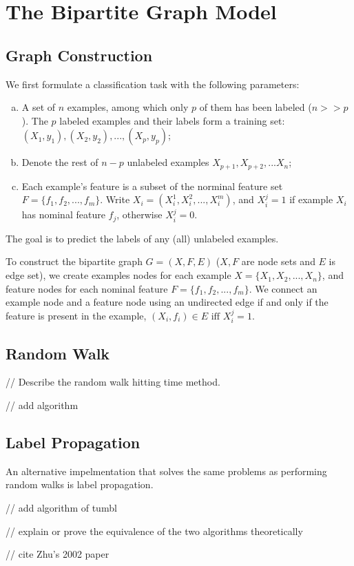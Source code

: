 \section{The Bipartite Graph Model}
\subsection{Graph Construction}

We first formulate a classification task with the following parameters:

\begin{enumerate}[a.]

    \item A set of $n$ examples, among which only $p$ of them has been labeled
        ($n >> p$).
        The $p$ labeled examples and their labels form a training set:
        $(X_1, y_1), (X_2, y_2), ..., (X_p, y_p)$;

    \item Denote the rest of $n-p$ unlabeled examples
        $X_{p+1}, X_{p+2}, ... X_{n}$; 

    \item Each example's feature is a subset of the norminal feature set 
        $F = \{f_1, f_2, ..., f_m\}$. 
        Write $X_i = (X_i^1, X_i^2, ..., X_i^m)$, and $X_i^j =
        1$ if example $X_i$ has nominal feature $f_j$, otherwise $X_i^j = 0$. 

\end{enumerate}
The goal is to predict the labels of any (all) unlabeled examples.

To construct the bipartite graph $G = (X, F, E)$ ($X, F$ are node sets and $E$
is edge set), we create examples nodes for each
example $X=\{X_1, X_2, ..., X_n\}$, and feature nodes for each nominal feature
$F=\{f_1, f_2, ..., f_m\}$.
We connect an example node and a feature node using an undirected
edge if and only if the feature is present in the example, $(X_i, f_i) \in E
\mbox{ iff } X_i^j = 1$.  


\subsection{Random Walk}

// Describe the random walk hitting time method.

// add algorithm


\subsection{Label Propagation}


An alternative impelmentation that solves the same problems as performing random
walks is label propagation.


// add algorithm of tumbl

// explain or prove the equivalence of the two algorithms theoretically

// cite Zhu's 2002 paper
